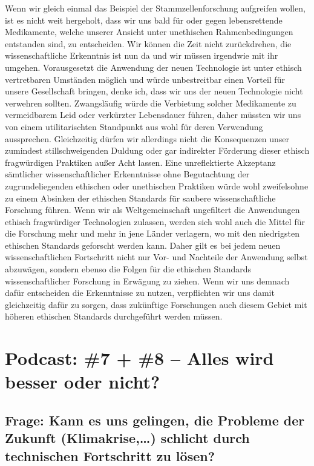 \documentclass[twoside, a4paper, DIV=11, open=any, bibliography=totoc]{scrbook}
\begin{document}
Wenn wir gleich einmal das Beispiel der Stammzellenforschung aufgreifen wollen,
ist es nicht weit hergeholt, dass wir uns bald für oder gegen lebensrettende Medikamente,
welche unserer Ansicht unter unethischen Rahmenbedingungen entstanden sind, zu entscheiden.
Wir können die Zeit nicht zurückdrehen, die wissenschaftliche Erkenntnis ist nun da
und wir müssen irgendwie mit ihr umgehen. Vorausgesetzt die Anwendung der neuen
Technologie ist unter ethisch vertretbaren Umständen möglich und würde unbestreitbar
einen Vorteil für unsere Gesellschaft bringen, denke ich, dass wir
uns der neuen Technologie nicht verwehren sollten. Zwangsläufig würde die Verbietung
solcher Medikamente zu vermeidbarem Leid oder verkürzter Lebensdauer führen, daher
müssten wir uns von einem utilitarischten Standpunkt aus wohl für deren Verwendung aussprechen.
Gleichzeitig dürfen wir allerdings nicht die Konsequenzen unser zumindest stillschweigenden
Duldung oder gar indirekter Förderung dieser ethisch fragwürdigen Praktiken außer Acht lassen.
Eine unreflektierte Akzeptanz sämtlicher wissenschaftlicher Erkenntnisse ohne
Begutachtung der zugrundeliegenden ethischen oder unethischen Praktiken würde wohl
zweifelsohne zu einem Absinken der ethischen Standards für saubere wissenschaftliche Forschung führen.
Wenn wir als Weltgemeinschaft ungefiltert die Anwendungen ethisch fragwürdiger Technologien
zulassen, werden sich wohl auch die Mittel für die Forschung mehr und mehr in jene Länder
verlagern, wo mit den niedrigsten ethischen Standards geforscht werden kann.
Daher gilt es bei jedem neuen wissenschaftlichen Fortschritt nicht nur Vor- und Nachteile
der Anwendung selbst abzuwägen, sondern ebenso die Folgen für die ethischen Standards
wissenschaftlicher Forschung in Erwägung zu ziehen.
Wenn wir uns demnach dafür entscheiden die Erkenntnisse zu nutzen, verpflichten
wir uns damit gleichzeitig dafür zu sorgen, dass zukünftige Forschungen auch diesem
Gebiet mit höheren ethischen Standards durchgeführt werden müssen.

\section{Podcast: \#7 + \#8 -- Alles wird besser oder nicht?}

\subsection{Frage: Kann es uns gelingen, die Probleme der Zukunft (Klimakrise,\dots)
schlicht durch technischen Fortschritt zu lösen?}
\end{document}
